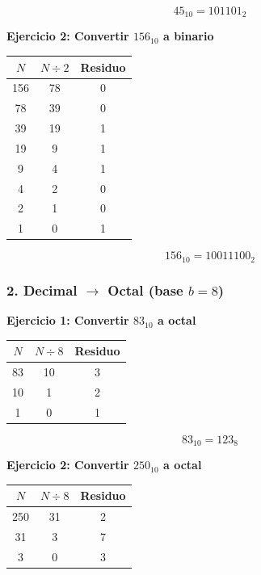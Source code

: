 \documentclass[12pt,twoside]{book}
\begin{document}
						\[
						45_{10} = 101101_2
						\]
						
						\noindent
						\textbf{Ejercicio 2: Convertir $156_{10}$ a binario}
						
						\begin{center}
							\begin{tabular}{c|c|c}
								$N$ & $N \div 2$ & Residuo \\
								\hline
								156 & 78 & 0 \\
								78  & 39 & 0 \\
								39  & 19 & 1 \\
								19  & 9  & 1 \\
								9   & 4  & 1 \\
								4   & 2  & 0 \\
								2   & 1  & 0 \\
								1   & 0  & 1 \\
							\end{tabular}
						\end{center}
						
						\[
						156_{10} = 10011100_2
						\]
						
						\subsubsection*{2. Decimal $\rightarrow$ Octal (base $b=8$)}
						
						\noindent
						\textbf{Ejercicio 1: Convertir $83_{10}$ a octal}
						
						\begin{center}
							\begin{tabular}{c|c|c}
								$N$ & $N \div 8$ & Residuo \\
								\hline
								83 & 10 & 3 \\
								10 & 1  & 2 \\
								1  & 0  & 1 \\
							\end{tabular}
						\end{center}
						
						\[
						83_{10} = 123_8
						\]
						
						\noindent
						\textbf{Ejercicio 2: Convertir $250_{10}$ a octal}
						
						\begin{center}
							\begin{tabular}{c|c|c}
								$N$ & $N \div 8$ & Residuo \\
								\hline
								250 & 31 & 2 \\
								31  & 3  & 7 \\
								3   & 0  & 3 \\
							\end{tabular}
						\end{center}
						
\end{document}
